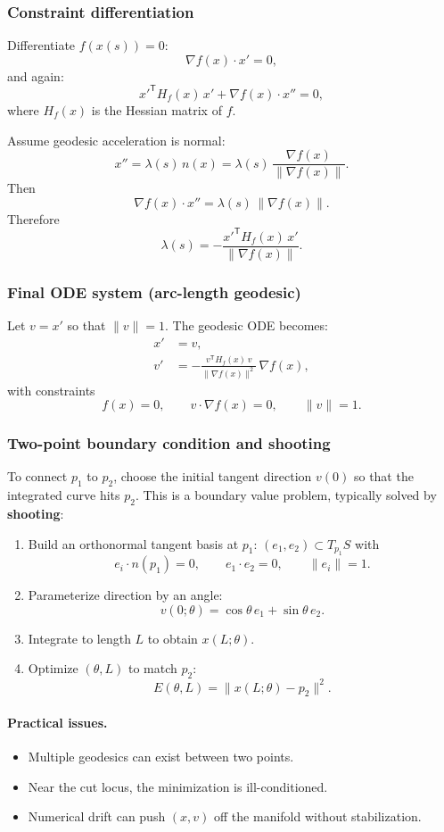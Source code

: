 \documentclass[12pt,a4paper]{article}
\theoremstyle{plain}
\theoremstyle{definition}
\begin{document}
		\subsubsection*{Constraint differentiation}
	Differentiate $f(x(s))=0$:
	\[
	\nabla f(x)\cdot x' = 0,
	\]
	and again:
	\[
	x'^{\mathsf T} H_f(x)\,x' + \nabla f(x)\cdot x'' = 0,
	\]
	where $H_f(x)$ is the Hessian matrix of $f$.
	
	Assume geodesic acceleration is normal:
	\[
	x'' = \lambda(s)\,n(x)=\lambda(s)\,\frac{\nabla f(x)}{\|\nabla f(x)\|}.
	\]
	Then
	\[
	\nabla f(x)\cdot x'' = \lambda(s)\,\|\nabla f(x)\|.
	\]
	Therefore
	\[
	\lambda(s) = -\frac{x'^{\mathsf T}H_f(x)\,x'}{\|\nabla f(x)\|}.
	\]
	
		\subsubsection*{Final ODE system (arc-length geodesic)}
	Let $v=x'$ so that $\|v\|=1$. The geodesic ODE becomes:
	\[
	\boxed{
		\begin{aligned}
			x' &= v,\\[4pt]
			v' &= -\frac{v^{\mathsf T}H_f(x)\,v}{\|\nabla f(x)\|^2}\,\nabla f(x),
	\end{aligned}}
	\]
	with constraints
	\[
	f(x)=0,\qquad v\cdot\nabla f(x)=0,\qquad \|v\|=1.
	\]
	
		\subsubsection*{Two-point boundary condition and shooting}
	To connect $p_1$ to $p_2$, choose the initial tangent direction $v(0)$ so that the integrated curve hits $p_2$.
	This is a boundary value problem, typically solved by \textbf{shooting}:
	\begin{enumerate}
		\item Build an orthonormal tangent basis at $p_1$: $(e_1,e_2)\subset T_{p_1}S$ with
		\[
		e_i\cdot n(p_1)=0,\qquad e_1\cdot e_2=0,\qquad \|e_i\|=1.
		\]
		\item Parameterize direction by an angle:
		\[
		v(0;\theta)=\cos\theta\,e_1+\sin\theta\,e_2.
		\]
		\item Integrate to length $L$ to obtain $x(L;\theta)$.
		\item Optimize $(\theta,L)$ to match $p_2$:
		\[
		E(\theta,L)=\|x(L;\theta)-p_2\|^2.
		\]
	\end{enumerate}
	
	\paragraph{Practical issues.}
	\begin{itemize}
		\item Multiple geodesics can exist between two points.
		\item Near the cut locus, the minimization is ill-conditioned.
		\item Numerical drift can push $(x,v)$ off the manifold without stabilization.
	\end{itemize}
	
\end{document}
